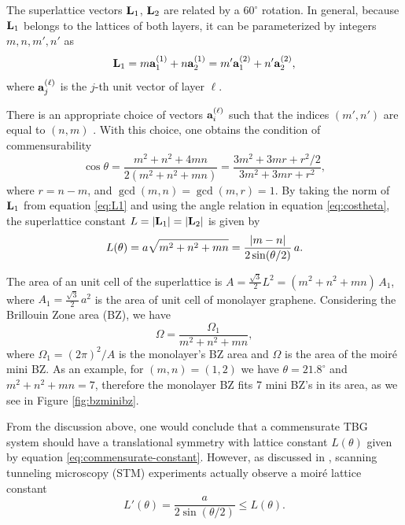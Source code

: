 \documentclass[12pt]{report}
\begin{document}
The superlattice vectors $\vb{L}_1$, $\vb{L}_2$ are related by a $60^\circ$ rotation. In general, because $\vb{L}_1$ belongs to the lattices of both layers, it can be parameterized by integers $m,n,m',n'$ as
\begin{equation} \label{eq:L1}
\vb{L}_1 = m\vb{a}_1^{(1)} + n\vb{a}_2^{(1)} = m'\vb{a}_1^{(2)} + n'\vb{a}_2^{(2)},
\end{equation}
where $\vb{a}_j^{(\ell)}$ is the $j$-th unit vector of layer $\ell$.

There is an appropriate choice of vectors $\vb{a}_i^{(\ell)}$ such that the indices $(m',n')$ are equal to $(n,m)$ \cite{koshino2012}. With this choice, one obtains the condition of commensurability
\begin{equation} \label{eq:costheta}
\cos\theta = \frac{m^2 + n^2 + 4mn}{2(m^2 + n^2 + mn)} = \frac{3 m^2 + 3mr + r^2/2}{3m^2 + 3mr + r^2},
\end{equation}
where $r = n-m$, and $\gcd(m,n) = \gcd(m,r)=1$. By taking the norm of $\vb{L}_1$ from equation \ref{eq:L1} and using the angle relation in equation \ref{eq:costheta}, the superlattice constant $L = \abs{\vb{L}_1} = \abs{\vb{L}_2}$ is given by
\begin{equation} \label{eq:commensurate-constant}
L(\theta) = a\sqrt{m^2 + n^2 + mn} = \frac{\abs{m-n}}{2 \sin(\theta/2)} \, a.
\end{equation}

The area of an unit cell of the superlattice is $A = \frac{\sqrt{3}}{2} L^2 = (m^2 + n^2 + mn) \, A_1$, where $A_1 = \frac{\sqrt{3}}{2} \, a^2$ is the area of unit cell of monolayer graphene. Considering the Brillouin Zone area (BZ), we have
\begin{equation} \label{eq:bz-volume}
\Omega = \frac{\Omega_1}{m^2 + n^2 + mn},
\end{equation}
where $\Omega_1 = (2\pi)^2/A$ is the monolayer's BZ area and $\Omega$ is the area of the moiré mini BZ. As an example, for $(m,n) = (1,2)$ we have $\theta = 21.8^\circ$ and $m^2 + n^2 + mn = 7$, therefore the monolayer BZ fits 7 mini BZ's in its area, as we see in Figure \ref{fig:bzminibz}.

\n

From the discussion above, one would conclude that a commensurate TBG system should have a translational symmetry with lattice constant $L(\theta)$ given by equation \ref{eq:commensurate-constant}. However, as discussed in \cite{zou2018}, scanning tunneling microscopy (STM) experiments actually observe a moiré lattice constant
\begin{equation} \label{eq:STM-constant}
L'(\theta) = \frac{a}{2 \sin(\theta/2)} \leq L(\theta).
\end{equation}
\end{document}
